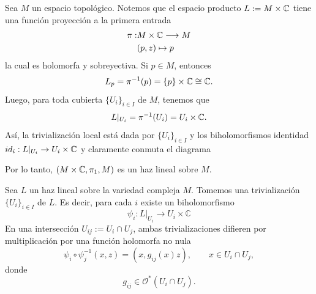     \begin{example}\label{haztrivial}
    	Sea $M$ un espacio topológico. Notemos que el espacio producto $L:=M\times\mathbb{C}$ tiene una función proyección a la primera entrada
    	\begin{align*}
    		\pi:&M\times\mathbb{C}\longrightarrow M\\
    		&(p,z)\mapsto p
    	\end{align*}
    	la cual es holomorfa y sobreyectiva. Si $p\in M$, entonces
    	\begin{align*}
    		L_p=\pi^{-1}(p)=\{p\}\times\mathbb{C}\cong \mathbb{C}.
    	\end{align*}
    	Luego, para toda cubierta $\{U_i\}_{i\in I}$ de $M$, tenemos que 
    	\begin{align*}
    		L|_{U_i}=\pi^{-1}(U_i)=U_i\times \mathbb{C}.
    	\end{align*} 
    	Así, la trivialización local está dada por $\{U_i\}_{i\in I}$ y los biholomorfismos identidad $id_i:L|_{U_i}\to U_i\times\mathbb{C}$ y claramente conmuta el diagrama
    	\begin{center}
    	\end{center}
    	Por lo tanto, $(M\times\mathbb{C},\pi_1,M)$ es un haz lineal sobre $M$. 
    \end{example}
    
    Sea $L$ un haz lineal sobre la variedad compleja $M$. Tomemos una trivialización $\{U_i\}_{i\in I}$ de $L$. Es decir, para cada $i$ existe un biholomorfismo
    \begin{equation*}
    	\psi_i :L|_{U_i}\longrightarrow U_i\times \mathbb{C}
    \end{equation*}
    En una intersección $U_{ij}:=U_i\cap U_j$, ambas trivializaciones difieren por multiplicación por una función holomorfa no nula
    \begin{equation*}
    	\psi_i\circ \psi_j^{-1}(x,z)=(x,g_{ij}(x)z),
    	\qquad x\in U_i\cap U_j,
    \end{equation*}
    donde
    \begin{equation*}
    	g_{ij}\in \mathcal{O}^*(U_i\cap U_j).
    \end{equation*}
    
